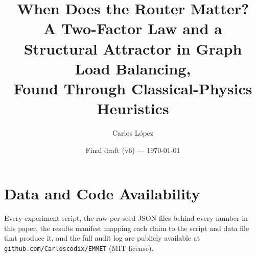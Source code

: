 \documentclass[11pt]{article}
\title{When Does the Router Matter?\\
\large A Two-Factor Law and a Structural Attractor in Graph Load Balancing,\\
Found Through Classical-Physics Heuristics}
\author{Carlos L\'opez}
\date{Final draft (v6) --- \today}
\begin{document}
\maketitle











































\section*{Data and Code Availability}
Every experiment script, the raw per-seed JSON files behind every number in
this paper, the results manifest mapping each claim to the script and data
file that produce it, and the full audit log are publicly available at
\texttt{github.com/Carloscodix/EMMET} (MIT license).

\appendix




\end{document}
